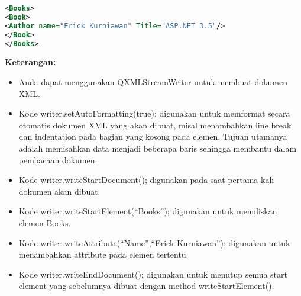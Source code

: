 \begin{lstlisting}[language=xml]
<Books>
<Book>
<Author name="Erick Kurniawan" Title="ASP.NET 3.5"/>
</Book>
</Books>
\end{lstlisting}

\textbf{Keterangan:}

\begin{itemize}

\item
  Anda dapat menggunakan QXMLStreamWriter untuk membuat dokumen XML.
\item
  Kode writer.setAutoFormatting(true); digunakan untuk memformat secara
  otomatis dokumen XML yang akan dibuat, misal menambahkan line break
  dan indentation pada bagian yang kosong pada elemen. Tujuan utamanya
  adalah memisahkan data menjadi beberapa baris sehingga membantu dalam
  pembacaan dokumen.
\item
  Kode writer.writeStartDocument(); digunakan pada saat pertama kali
  dokumen akan dibuat.
\item
  Kode writer.writeStartElement(``Books''); digunakan untuk menuliskan
  elemen Books.
\item
  Kode writer.writeAttribute(``Name'',``Erick Kurniawan''); digunakan
  untuk menambahkan attribute pada elemen tertentu.
\item
  Kode writer.writeEndDocument(); digunakan untuk menutup semua start
  element yang sebelumnya dibuat dengan method writeStartElement().
\end{itemize}
